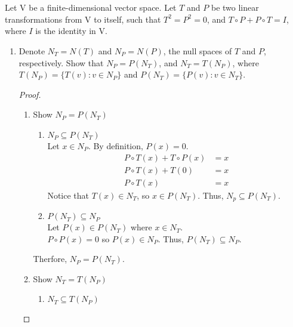 \documentclass[11pt]{scrartcl}
\begin{document}
\section{}
Let $\mathrm{V}$ be a finite-dimensional vector space. Let $T$ and $P$ be two linear transformations from $\mathrm{V}$ to itself, such that $T^2= P^2 = 0$, and $T \circ P + P \circ T = I$, where $I$ is the identity in $\mathrm{V}$.
\begin{enumerate}[label=\alph*.]
	\item{
	      Denote $N_T = N(T)$ and $N_P = N(P)$, the null spaces of $T$ and $P$, respectively.
	      Show that $N_P = P(N_T)$, and $N_T = T(N_P)$, where $T(N_P) = \{ T(v): v \in N_P \}$ and $P(N_T) = \{ P(v): v \in N_T \}$.
	      \begin{proof}\
		      \begin{enumerate}[label=\roman*.]
			      \item{
			            Show $N_P = P(N_T)$
			            \begin{enumerate}[label=\arabic*.]
				            \item{
				                  $N_P \subseteq P(N_T)$\\
				                  Let $x \in N_P$. By definition, $P(x) = 0$.
				                  \begin{align*}
					                  P \circ T(x) + T \circ P(x) & = x \\
					                  P \circ T(x) + T(0)         & = x \\
					                  P \circ T(x)                & = x
				                  \end{align*}
				                  Notice that $T(x) \in N_T$, so $x \in P(N_T)$. Thus, $N_p \subseteq P(N_T)$.
				                  }
				            \item{
				                  $P(N_T) \subseteq N_P $\\
				                  Let $P(x) \in P(N_T)$ where $x \in N_T$.\\
				                  $P \circ P(x) = 0$ so $P(x) \in N_P$. Thus, $P(N_T) \subseteq N_P$.
				                  }
			            \end{enumerate}
			            Therfore, $N_P = P(N_T)$.
			            }
			      \item{
			            Show $N_T = T(N_P)$
			            \begin{enumerate}[label=\arabic*.]
				            \item{
				                  $N_T  \subseteq T(N_P)$\\
}
\end{enumerate}}
\end{enumerate}
\end{proof}}
\end{enumerate}
\end{document}
